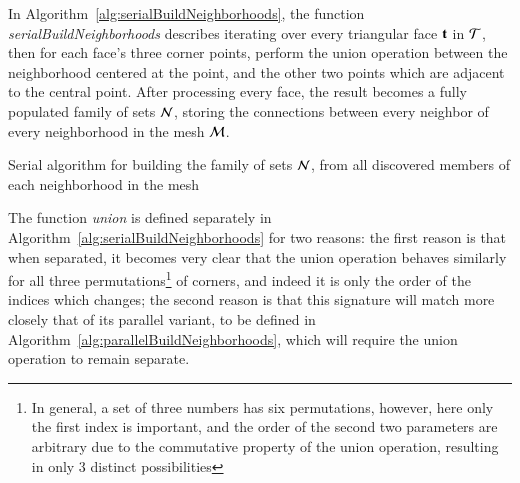 In Algorithm~\ref{alg:serialBuildNeighborhoods}, the function \textit{serialBuildNeighborhoods} describes iterating over every triangular face $\mathbf{t}$ in $\mathcal{T}$, then for each face's three corner points, perform the union operation between the neighborhood centered at the point, and the other two points which are adjacent to the central point. After processing every face, the result becomes a fully populated family of sets $\mathcal{N}$, storing the connections between every neighbor of every neighborhood in the mesh $\mathcal{M}$.

\begin{algorithm}[ht]
	\DontPrintSemicolon


	\bigskip
\nl	{}

	\bigskip
\nl	{}
	\caption{Serial algorithm for building the family of sets $\mathcal{N}$, from all discovered members of each neighborhood in the mesh\label{alg:serialBuildNeighborhoods}}
\end{algorithm}%

The function \textit{union} is defined separately in Algorithm~\ref{alg:serialBuildNeighborhoods} for two reasons: the first reason is that when separated, it becomes very clear that the union operation behaves similarly for all three permutations\footnote{In general, a set of three numbers has six permutations, however, here only the first index is important, and the order of the second two parameters are arbitrary due to the commutative property of the union operation, resulting in only 3 distinct possibilities} of corners, and indeed it is only the order of the indices which changes; the second reason is that this signature will match more closely that of its parallel variant, to be defined in Algorithm~\ref{alg:parallelBuildNeighborhoods}, which will require the union operation to remain separate.

